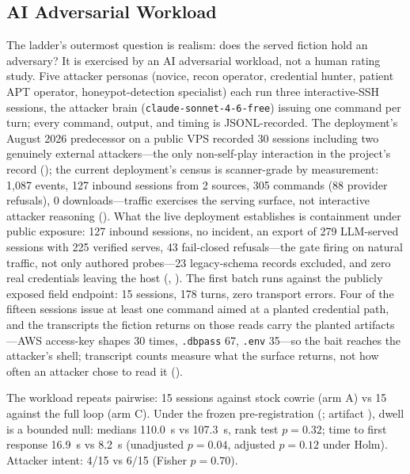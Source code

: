 \subsection{AI Adversarial Workload}
\label{sec:advworkload}
The ladder's outermost question is realism: does the served fiction
hold an adversary? It is exercised by an AI adversarial workload, not a
human rating study. Five attacker personas (novice, recon operator,
credential hunter, patient APT operator, honeypot-detection specialist)
each run three interactive-SSH sessions, the attacker brain
(\texttt{claude-sonnet-4-6-free}) issuing one command per turn; every
command, output, and timing is JSONL-recorded. The deployment's August 2026 predecessor on a public
VPS recorded 30 sessions including two genuinely external attackers---the
only non-self-play interaction in the project's record
(); the current deployment's census is scanner-grade by measurement: 1,087
events, 127 inbound sessions from 2 sources, 305 commands (88 provider
refusals), 0 downloads---traffic exercises the serving surface, not
interactive attacker reasoning (). What the live deployment establishes is containment under public
exposure: 127 inbound sessions, no incident, an export of 279 LLM-served
sessions with 225 verified serves, 43 fail-closed refusals---the gate
firing on natural traffic, not only authored probes---23 legacy-schema
records excluded, and zero real credentials leaving the host
(,
). The first batch runs against the publicly exposed
field endpoint: 15 sessions, 178 turns, zero transport errors. Four of
the fifteen sessions issue at least one command aimed at a planted
credential path, and the transcripts the fiction returns on those reads
carry the planted artifacts---AWS access-key shapes 30 times,
\texttt{.dbpass} 67, \texttt{.env} 35---so the bait reaches the
attacker's shell; transcript counts measure what the surface returns,
not how often an attacker chose to read it
().

The workload repeats pairwise: 15 sessions against stock cowrie (arm A)
vs 15 against the full loop (arm C). Under the frozen pre-registration
(; artifact
), dwell is a
bounded null: medians 110.0~s vs 107.3~s, rank test $p=0.32$; time to
first response 16.9~s vs 8.2~s (unadjusted $p=0.04$, adjusted $p=0.12$
under Holm). Attacker intent: 4/15 vs 6/15 (Fisher $p=0.70$).

